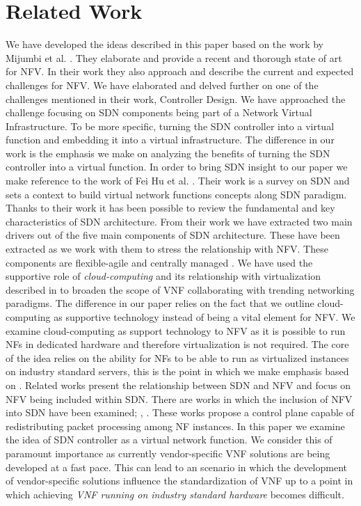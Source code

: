\documentclass[sigconf]{Template}
\begin{document}
\section{Related Work}
We have developed the ideas described in this paper based on the work  by Mijumbi et al. \cite{mijumbi2016_NFV_stateofart}. They elaborate and provide a recent and thorough state of art for NFV. In their work they also approach and describe the current and expected challenges for NFV. 
We have elaborated and delved further on one of the challenges mentioned in their work, Controller Design. We have approached the challenge focusing on SDN components being part of a Network Virtual Infrastructure. To be more specific, turning the SDN controller into a virtual function and embedding it into a virtual infrastructure. The difference in our work is the emphasis we make on analyzing the benefits of turning the SDN controller into a virtual function. In order to bring SDN insight to our paper we make reference to the work of Fei Hu et al. \cite{hu2014_SDN_survey}. Their work is a survey on SDN and sets a context to build virtual network functions concepts along SDN paradigm. Thanks to their work it has been possible to review the fundamental and key characteristics of SDN architecture. From their work we have extracted two main drivers out of the five main components of SDN architecture. These have been extracted as we work with them to stress the relationship with NFV. These components are flexible-agile and centrally managed \cite{jarschel2014interfaces_SDN}.
We have used the supportive role of \emph{cloud-computing} and its relationship with virtualization described in \cite{mijumbi2016_NFV_stateofart} to broaden the scope of VNF collaborating with trending networking paradigms. The difference in our paper relies on the fact that we outline cloud-computing as supportive technology instead of being a vital element for NFV. We examine cloud-computing as support technology to NFV as it is possible to run NFs in dedicated hardware and therefore virtualization is not required. The core of the idea relies on the ability for NFs to be able to run as virtualized instances on industry standard servers, this is the point in which we make emphasis based on \cite{mijumbi2016_NFV_stateofart}.
Related works present the relationship between SDN and NFV and focus on NFV being included within SDN. There are works in which the inclusion of NFV into SDN have been examined; \cite{kawashima2012_vnfc}, \cite{gember2014opennf}. These works propose a control plane capable of redistributing packet processing among NF instances.
In this paper we examine the idea of SDN controller as a virtual network function. We consider this of paramount importance as currently vendor-specific VNF solutions are being developed at a fast pace. This can lead to an scenario in which the development of vendor-specific solutions influence the standardization of VNF up to a point in which achieving \emph{VNF running on industry standard hardware} becomes difficult.
\end{document}
